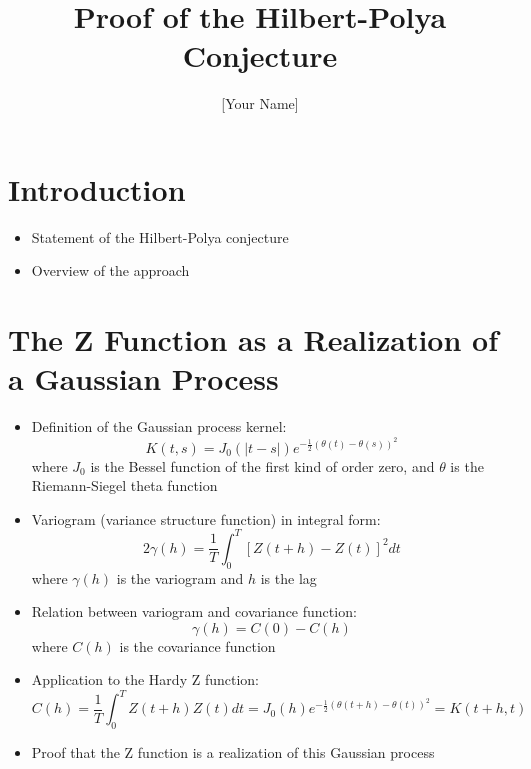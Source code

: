 \documentclass{article}
\title{Proof of the Hilbert-Polya Conjecture}
\author{[Your Name]}
\begin{document}
\maketitle


\section{Introduction}
\begin{itemize}
    \item Statement of the Hilbert-Polya conjecture
    \item Overview of the approach
\end{itemize}

\section{The Z Function as a Realization of a Gaussian Process}
\begin{itemize}
    \item Definition of the Gaussian process kernel:
    $$ K(t,s) = J_0(|t-s|) e^{-\frac{1}{2}(\theta(t) - \theta(s))^2} $$
    where $J_0$ is the Bessel function of the first kind of order zero, and $\theta$ is the Riemann-Siegel theta function

    \item Variogram (variance structure function) in integral form:
    $$ 2\gamma(h) = \frac{1}{T} \int_0^T [Z(t+h) - Z(t)]^2 dt $$
    where $\gamma(h)$ is the variogram and $h$ is the lag

    \item Relation between variogram and covariance function:
    $$ \gamma(h) = C(0) - C(h) $$
    where $C(h)$ is the covariance function

    \item Application to the Hardy Z function:
    $$ C(h) = \frac{1}{T} \int_0^T Z(t+h)Z(t) dt = J_0(h) e^{-\frac{1}{2}(\theta(t+h) - \theta(t))^2} = K(t+h,t) $$

    \item Proof that the Z function is a realization of this Gaussian process
\end{itemize}
\end{document}
